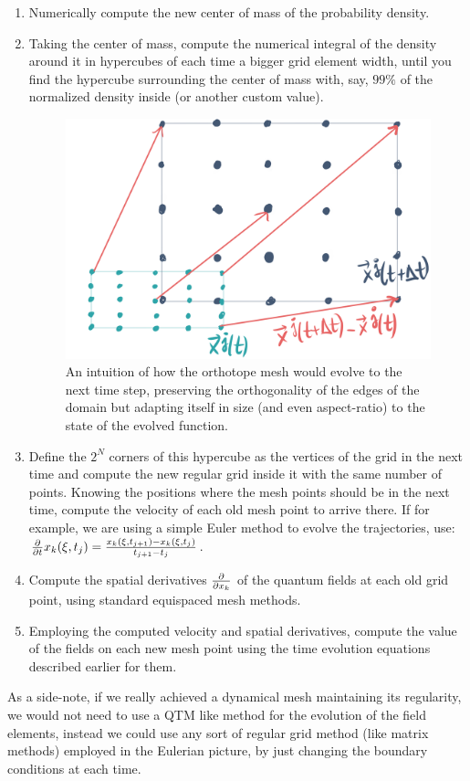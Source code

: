 \documentclass[11pt, a4paper]{article} %
\begin{document}
\begin{enumerate}
\item Numerically compute the new center of mass of the probability density.
\item Taking the center of mass, compute the numerical integral of the density around it in hypercubes of each time a bigger grid element width, until you find the hypercube surrounding the center of mass with, say, $99\%$ of the normalized density inside (or another custom value).
\begin{figure}[h!]
  \centering
    \includegraphics[width=0.65\linewidth]{9orthotope.png}
  \caption{ An intuition of how the orthotope mesh would evolve to the next time step, preserving the orthogonality of the edges of the domain but adapting itself in size (and even aspect-ratio) to the state of the evolved function. }
  \label{fig:ortho}
\end{figure}
\item Define the $2^N$ corners of this hypercube as the vertices of the grid in the next time and compute the new regular grid inside it with the same number of points. Knowing the positions where the mesh points should be in the next time, compute the velocity of each old mesh point to arrive there. If for example, we are using a simple Euler method to evolve the trajectories, use: $\pdv{}{t}x_k(\xi,t_{j})=\frac{x_k(\xi,t_{j+1})-x_k(\xi,t_{j})}{t_{j+1}-t_j}$.
\item Compute the spatial derivatives $\pdv{}{x_k}$ of the quantum fields at each old grid point, using standard equispaced mesh methods.
\item Employing the computed velocity and spatial derivatives, compute the value of the fields on each new mesh point using the time evolution equations described earlier for them.
\end{enumerate}

As a side-note, if we really achieved a dynamical mesh maintaining its regularity, we would not need to use a QTM like method for the evolution of the field elements, instead we could use any sort of regular grid method (like matrix methods) employed in the Eulerian picture, by just changing the boundary conditions at each time.
\end{document}
